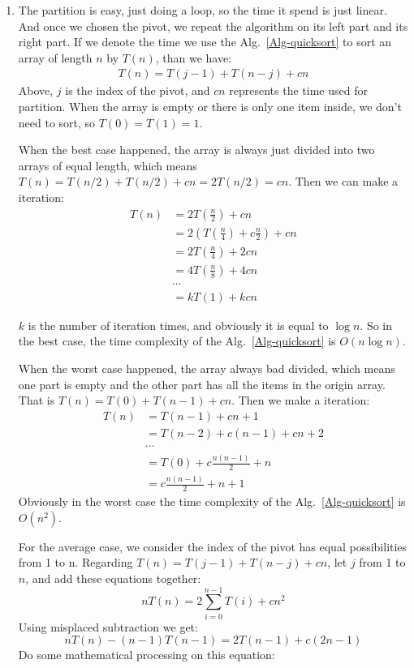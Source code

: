 \documentclass[12pt,a4paper]{article}
\makeatletter
\newtheorem*{solution}{Solution}
\theoremstyle{definition}
\renewenvironment{solution}[1][Solution] {\par\pushQED{\qed}\normalfont\topsep6\p@\@plus6\p@\relax\trivlist\item[\hskip\labelsep\bfseries#1\@addpunct{.}]\ignorespaces}{\popQED\endtrivlist\@endpefalse} \makeatother
\makeatother
\begin{document}
\begin{enumerate}
\begin{solution}
\begin{enumerate}
        The partition is easy, just doing a loop, so the time it spend is just linear. And once we chosen the pivot, we repeat the algorithm on its left part and its right part. If we denote the time we use the Alg.~\ref{Alg-quicksort} to sort an array of length $n$ by $T(n)$, than we have:
        \begin{align*}
        T(n) = T(j-1) + T(n-j) + cn
        \end{align*}
        Above, $j$ is the index of the pivot, and $cn$ represents the time used for partition. When the array is empty or there is only one item inside, we don't need to sort, so $T(0) = T(1) = 1$.

        When the best case happened, the array is always just divided into two arrays of equal length, which means $T(n) = T(n/2) + T(n/2) + cn = 2T(n/2) = cn$. Then we can make a iteration:
        \begin{align*}
        T(n) &= 2T(\frac{n}{2}) + cn \\
        &= 2(T(\frac{n}{4}) + c\frac{n}{2}) + cn\\
        &= 2T(\frac{n}{4}) + 2cn\\
        &= 4T(\frac{n}{8}) + 4cn\\
        &\cdots\\
        &= kT(1) + kcn
        \end{align*}
        
        $k$ is the number of iteration times, and obviously it is equal to $\log n$. So in the best case, the time complexity of the Alg.~\ref{Alg-quicksort} is $O(n\log n)$.
        
        When the worst case happened, the array always bad divided, which means one part is empty and the other part has all the items in the origin array. That is $T(n) = T(0) + T(n-1) + cn$. Then we make a iteration:
        \begin{align*}
        T(n) &= T(n-1) + cn + 1\\
        &= T(n-2) +c(n-1) + cn + 2\\
        &\cdots\\
        &= T(0) + c\frac{n(n-1)}{2} + n\\
        &= c\frac{n(n-1)}{2} + n + 1
        \end{align*}
        Obviously in the worst case the time complexity of the Alg.~\ref{Alg-quicksort} is $O(n^2)$.
        
        For the average case, we consider the index of the pivot has equal possibilities from 1 to n. Regarding  $T(n) = T(j-1) + T(n-j) + cn$, let $j$ from 1 to $n$, and add these equations together:
        $$nT(n) = 2\sum^{n-1}_{i=0}T(i)+cn^2$$
        Using misplaced subtraction we get:
        $$nT(n) - (n-1)T(n-1) = 2T(n-1)+c(2n-1)$$
        Do some mathematical processing on this equation:


\end{enumerate}
\end{solution}
\end{enumerate}
\end{document}
